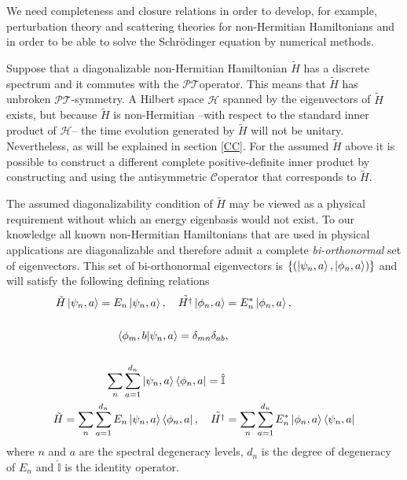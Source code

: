 \documentclass[12pt, a4paper]{report}
\newcommand\PT{\(\mathcal{PT}\)}
\newcommand\CC{\(\mathcal{C}\)}
\begin{document}
We need completeness and closure relations in order to develop, for example, perturbation theory and scattering theories for non-Hermitian Hamiltonians and in order to be able to solve the Schrödinger equation by numerical methods\cite{Moiseyev}.

Suppose that a diagonalizable non-Hermitian Hamiltonian $\tilde{H}$ has a discrete spectrum and it commutes with the \PT\:operator.  This means that  $\tilde{H}$ has unbroken \PT-symmetry. A Hilbert space $\mathcal{H}$ spanned by the eigenvectors of $\tilde{H}$ exists, but because $\tilde{H}$ is non-Hermitian --with respect to the standard inner product of $\mathcal{H}$-- the time evolution generated by $\tilde{H}$ will not be unitary\cite{Mostafazadeh}. Nevertheless, as will be explained in section \ref{CC}. For the assumed $\tilde{H}$ above it is possible to construct a different complete positive-definite inner product by constructing and using the antisymmetric \CC\:operator that corresponds to $\tilde{H}$.

The assumed diagonalizability condition of $\tilde{H}$ may be viewed as a physical requirement without which an energy eigenbasis would not exist. To our knowledge all known non-Hermitian Hamiltonians that are used in physical applications are diagonalizable and therefore admit a complete \emph{bi-orthonormal} set of eigenvectors. This set of bi-orthonormal eigenvectors is $\{(\ket{\psi_{n}, a}, \ket{\phi_{n}, a})\}$ and will satisfy the following defining relations\cite{Pseudo-HermiticityIII}
\begin{align}
\tilde{H}\ket{\psi_{n}, a} = E_{n}\ket{\psi_{n}, a},\quad\tilde{H^{\dagger}}\ket{\phi_{n}, a} &= E^{*}_{n}\ket{\phi_{n}, a},\\
\nonumber\\
\braket{\phi_{m}, b|\psi_{n}, a} = \delta_{mn}\delta_{ab}&,\\
\nonumber\\
\sum^{}_{n}\sum_{a=1}^{d_n}\ket{\psi_{n}, a}\bra{\phi_{n}, a} = \hat{\mathbb{I}}&\\
\tilde{H} = \sum^{}_{n}\sum_{a=1}^{d_n}E_{n}\ket{\psi_{n}, a}\bra{\phi_{n}, a},\quad\tilde{H^{\dagger}} &= \sum^{}_{n}\sum_{a=1}^{d_n}E_{n}^{*}\ket{\phi_{n}, a}\bra{\psi_{n}, a}
\end{align}
where $n$ and $a$ are the spectral degeneracy levels, $d_n$ is the degree of degeneracy of $E_n$ and $\hat{\mathbb{I}}$ is the identity operator\cite{Pseudo-HermiticityIII}.

\end{document}

